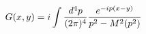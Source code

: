 \begin{equation}
\label{otto}
 G(x,y)=i \int \frac{d^4 p}{(2\pi)^4} {{e^{-ip(x-y)}} \over {p^2 - M^2(p^2)}}
\end{equation}


